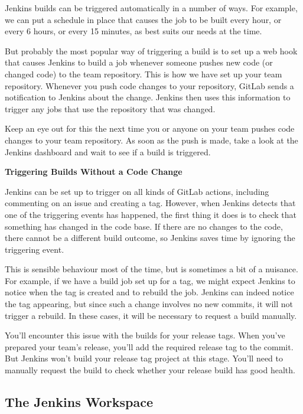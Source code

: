 \documentclass[
]{book}
\begin{document}
Jenkins builds can be triggered automatically in a number of ways. For example, we can put a schedule in place that causes the job to be built every hour, or every 6 hours, or every 15 minutes, as best suits our needs at the time.

But probably the most popular way of triggering a build is to set up a web hook that causes Jenkins to build a job whenever someone pushes new code (or changed code) to the team repository. This is how we have set up your team repository. Whenever you push code changes to your repository, GitLab sends a notification to Jenkins about the change. Jenkins then uses this information to trigger any jobs that use the repository that was changed.

Keep an eye out for this the next time you or anyone on your team pushes code changes to your team repository. As soon as the push is made, take a look at the Jenkins dashboard and wait to see if a build is triggered.

\textbf{Triggering Builds Without a Code Change}

Jenkins can be set up to trigger on all kinds of GitLab actions, including commenting on an issue and creating a tag. However, when Jenkins detects that one of the triggering events has happened, the first thing it does is to check that something has changed in the code base. If there are no changes to the code, there cannot be a different build outcome, so Jenkins saves time by ignoring the triggering event.

This is sensible behaviour most of the time, but is sometimes a bit of a nuisance. For example, if we have a build job set up for a tag, we might expect Jenkins to notice when the tag is created and to rebuild the job. Jenkins can indeed notice the tag appearing, but since such a change involves no new commits, it will not trigger a rebuild. In these cases, it will be necessary to request a build manually.

You'll encounter this issue with the builds for your release tags. When you've prepared your team's release, you'll add the required release tag to the commit. But Jenkins won't build your release tag project at this stage. You'll need to manually request the build to check whether your release build has good health.

\hypertarget{workspace}{%
\subsection{The Jenkins Workspace}\label{workspace}}
\end{document}
